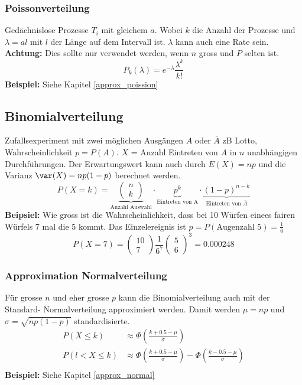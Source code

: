 \subsubsection{Poissonverteilung}
Gedächnislose Prozesse $T_i$ mit gleichem $a$. Wobei $k$ die Anzahl der Prozesse und $\lambda = al$ mit $l$ der Länge auf dem Intervall ist. $\lambda$ kann auch eine Rate sein. \textbf{Achtung:} Dies sollte nur verwendet werden, wenn $n$ gross und $P$ selten ist.
\[
P_k(\lambda) = e^{-\lambda}\frac{\lambda^k}{k!}
\]
\noindent\textbf{Beispiel:} Siehe Kapitel \ref{approx_poission}

\subsection{Binomialverteilung}
Zufallsexperiment mit zwei möglichen Ausgängen $A$ oder $\overline{A}$ zB Lotto, Wahrscheinlichkeit $p = P(A)$. $X$ = Anzahl Eintreten von $A$ in $n$ unabhängigen Durchführungen. Der Erwartungswert kann auch durch $E(X) = np$ und die Varianz $\var(X) = np(1 - p)$ berechnet werden.
\[
P(X = k) = \underbrace{\begin{pmatrix}	n \\ k \end{pmatrix}}_{\text{Anzahl Auswahl}}\cdot \underbrace{p^k}_{\text{Eintreten von A}}\cdot\underbrace{(1-p)^{n-k}}_{\text{Eintreten von }\overline{A
}}
\]
\noindent\textbf{Beipsiel:} Wie gross ist die Wahrscheinlichkeit, dass bei 10 Würfen einees fairen Würfels 7 mal die 5 kommt. Das Einzelereignis ist $p = P(\text{Augenzahl } 5) = \frac{1}{6}$
\[
P (X = 7) = \begin{pmatrix}	10 \\ 7 \end{pmatrix} \frac{1}{6^7}\begin{pmatrix}	5 \\ 6 \end{pmatrix}^3 = 0.000248
\]
\subsubsection{Approximation Normalverteilung}
Für grosse $n$ und eher grosse $p$ kann die Binomialverteilung auch mit der Standard- Normalverteilung approximiert werden. Damit werden $\mu = np$ und $\sigma = \sqrt{np(1-p)}$ standardisierte. 
\begin{align*}
	P(X \leq k) &\approx \Phi(\frac{k + 0.5 - \mu}{\sigma}) \\
	P(l < X \leq k) &\approx \Phi(\frac{k + 0.5 - \mu}{\sigma})  - \Phi(\frac{k - 0.5 - \mu}{\sigma}) \\
\end{align*}
\noindent\textbf{Beispiel:} Siehe Kapitel \ref{approx_normal}

